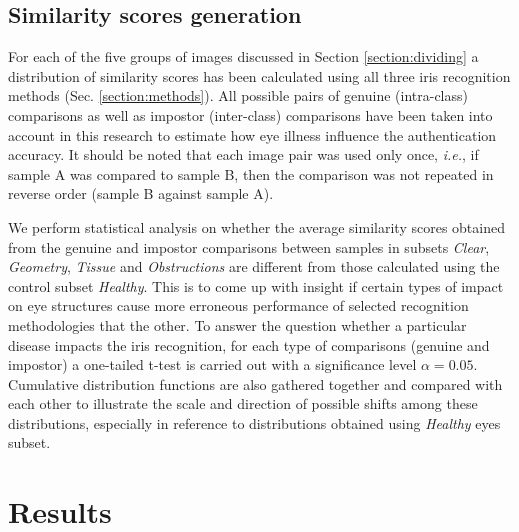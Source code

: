 \documentclass[conference]{IEEEtran}
\begin{document}
\subsection{Similarity scores generation}
For each of the five groups of images discussed in Section \ref{section:dividing} a distribution of similarity scores has been calculated using all three iris recognition methods (Sec. \ref{section:methods}). All possible pairs of genuine (intra-class) comparisons as well as impostor (inter-class) comparisons have been taken into account in this research to estimate how eye illness influence the authentication accuracy. It should be noted that each image pair was used only once, \emph{i.e.}, if sample A was compared to sample B, then the comparison was not repeated in reverse order (sample B against sample A).

We perform statistical analysis on whether the average similarity scores obtained from the genuine and impostor comparisons between samples in subsets \emph{Clear}, \emph{Geometry}, \emph{Tissue} and \emph{Obstructions} are different from those calculated using the control subset \emph{Healthy}. This is to come up with insight if certain types of impact on eye structures cause more erroneous performance of selected recognition methodologies that the other. To answer the question whether a particular disease impacts the iris recognition, for each type of comparisons (genuine and impostor) a one-tailed t-test is carried out with a significance level $\alpha = 0.05$. Cumulative distribution functions are also gathered together and compared with each other to illustrate the scale and direction of possible shifts among these distributions, especially in reference to distributions obtained using \emph{Healthy} eyes subset.

\section{Results}
\label{sec:Results}
\end{document}
